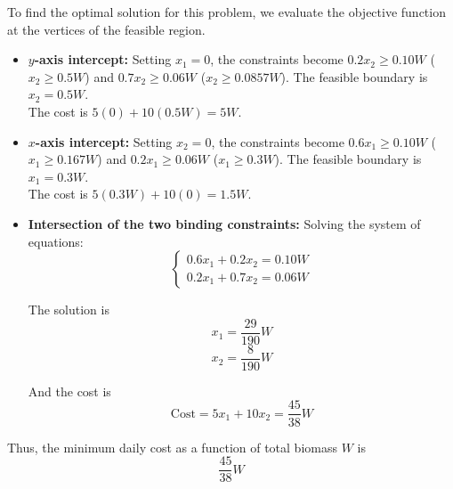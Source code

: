 \documentclass[12pt,a4paper]{article}
\theoremstyle{definition}
\begin{document}
\begin{enumerate}
\begin{enumerate}
        To find the optimal solution for this problem, we evaluate the objective function at the vertices of the feasible region.

        \begin{itemize}
            \item \textbf{$y$-axis intercept:} Setting $x_1 = 0$, the constraints become $0.2x_2 \ge 0.10W$ ($x_2 \ge 0.5W$) and $0.7x_2 \ge 0.06W$ ($x_2 \ge 0.0857W$). The feasible boundary is $x_2 = 0.5W$. \\
            The cost is $5(0) + 10(0.5W) = 5W$.
            
            \item \textbf{$x$-axis intercept:} Setting $x_2 = 0$, the constraints become $0.6x_1 \ge 0.10W$ ($x_1 \ge 0.167W$) and $0.2x_1 \ge 0.06W$ ($x_1 \ge 0.3W$). The feasible boundary is $x_1 = 0.3W$. \\
            The cost is $5(0.3W) + 10(0) = 1.5W$.
            
            \item \textbf{Intersection of the two binding constraints:}
            Solving the system of equations:
            \[
            \begin{cases}
            0.6x_1 + 0.2x_2 = 0.10W \\
            0.2x_1 + 0.7x_2 = 0.06W
            \end{cases}
            \]
    
            The solution is
            \[
            x_1 = \frac{29}{190}W
            \]
            \[
            x_2 = \frac{8}{190}W
            \]
    
            And the cost is
            \[
            \text{Cost} = 5x_1 + 10x_2 = \frac{45}{38}W
            \]

        \end{itemize}
        
        Thus, the minimum daily cost as a function of total biomass $W$ is
        \[
        \boxed{\frac{45}{38}W}
        \]
        
    \end{enumerate}
\end{enumerate}
\end{document}
